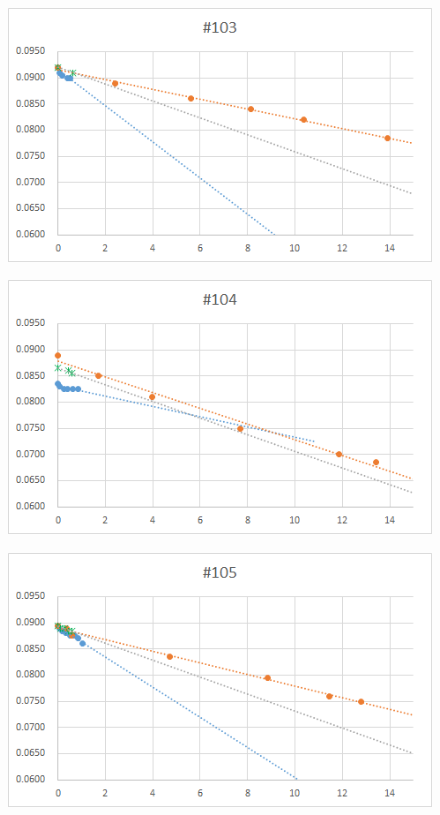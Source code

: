   \begin{figure}[htbp]
    \centering
       \includegraphics[width=120mm]{vol_103.png}
  \end{figure}
  \begin{figure}[htbp]
    \centering
       \includegraphics[width=120mm]{vol_104.png}
  \end{figure}
  \begin{figure}[htbp]
    \centering
       \includegraphics[width=120mm]{vol_105.png}
  \end{figure}

